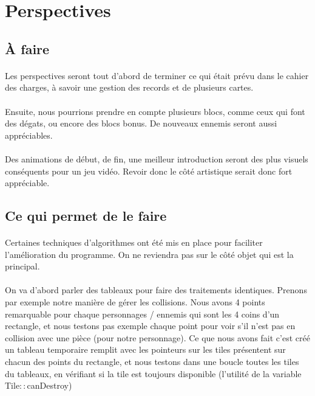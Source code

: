 ﻿\section{Perspectives}

\subsection{À faire}

\paragraph{} Les perspectives seront tout d'abord de terminer ce qui était prévu dans le cahier des charges, à savoir une gestion des records et de plusieurs cartes.
\paragraph{} Ensuite, nous pourrions prendre en compte plusieurs blocs, comme ceux qui font des dégats, ou encore des blocs bonus. De nouveaux ennemis seront aussi appréciables.
\paragraph{} Des animations de début, de fin, une meilleur introduction seront des plus visuels conséquents pour un jeu vidéo. Revoir donc le côté artistique serait donc fort appréciable.

\subsection{Ce qui permet de le faire}

\paragraph{} Certaines techniques d'algorithmes ont été mis en place pour faciliter l'amélioration du programme. On ne reviendra pas sur le côté objet qui est la principal.
\paragraph{} On va d'abord parler des tableaux pour faire des traitements identiques. Prenons par exemple notre manière de gérer les collisions. Nous avons 4 points remarquable pour chaque personnages / ennemis qui sont les 4 coins d'un rectangle, et nous testons pas exemple chaque point pour voir s'il n'est pas en collision avec une pièce (pour notre personnage). Ce que nous avons fait c'est créé un tableau temporaire remplit avec les pointeurs sur les tiles présentent sur chacun des points du rectangle, et nous testons dans une boucle toutes les tiles du tableaux, en vérifiant si la tile est toujours disponible (l'utilité de la variable Tile$::$canDestroy)
